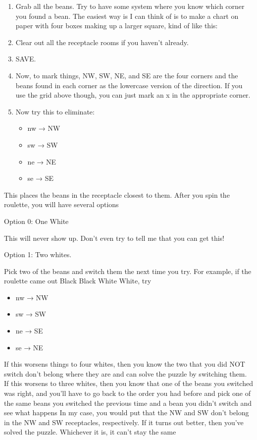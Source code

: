 \documentclass[12pt]{article}
\providecommand{\tightlist}{%
  \setlength{\itemsep}{0pt}\setlength{\parskip}{0pt}}
\begin{document}
\begin{enumerate}
\def\labelenumi{\arabic{enumi}.}
\item
  Grab all the beans. Try to have some system where you know which
  corner you found a bean. The easiest way is I can think of is to make
  a chart on paper with four boxes making up a larger square, kind of
  like this:

\item
  Clear out all the receptacle rooms if you haven't already.
\item
  SAVE.
\item
  Now, to mark things, NW, SW, NE, and SE are the four corners and the
  beans found in each corner as the lowercase version of the direction.
  If you use the grid above though, you can just mark an x in the
  appropriate corner.
\item
  Now try this to eliminate:

  \begin{itemize}
  \tightlist
  \item
    nw → NW
  \item
    sw → SW
  \item
    ne → NE
  \item
    se → SE
  \end{itemize}
\end{enumerate}

This places the beans in the receptacle closest to them. After you spin
the roulette, you will have several options

Option 0: One White

This will never show up. Don't even try to tell me that you can get
this!

Option 1: Two whites.

Pick two of the beans and switch them the next time you try. For
example, if the roulette came out Black Black White White, try

\begin{itemize}
\tightlist
\item
  nw → NW
\item
  sw → SW
\item
  ne → SE
\item
  se → NE
\end{itemize}

If this worsens things to four whites, then you know the two that you
did NOT switch don't belong where they are and can solve the puzzle by
switching them. If this worsens to three whites, then you know that one
of the beans you switched was right, and you'll have to go back to the
order you had before and pick one of the same beans you switched the
previous time and a bean you didn't switch and see what happens In my
case, you would put that the NW and SW don't belong in the NW and SW
receptacles, respectively. If it turns out better, then you've solved
the puzzle. Whichever it is, it can't stay the same
\end{document}
